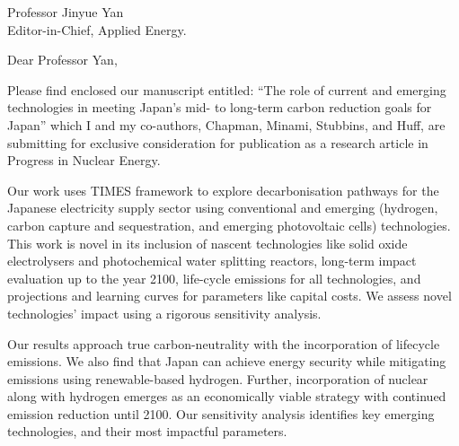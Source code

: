 \documentclass[10pt]{letter} %
\begin{document}


\begin{letter}{Professor Jinyue Yan\\
Editor-in-Chief, Applied Energy.}


\address{Anshuman Chaube\\
achaube2@illinois.edu\\
226 Talbot Laboratory\\
MC-234\\
104 S. Wright Street\\
Urbana, IL 61801}



\opening{Dear Professor Yan,}

Please find enclosed our manuscript entitled: ``The role of current and emerging technologies in meeting Japan's mid- to long-term carbon reduction goals for Japan'' which I and my co-authors, Chapman, Minami, Stubbins, and Huff, 
are submitting for exclusive consideration for publication as a research 
article in Progress in Nuclear Energy.

Our work uses TIMES framework to explore decarbonisation pathways for the Japanese electricity supply sector using conventional and emerging (hydrogen, carbon capture and sequestration, and emerging photovoltaic cells) technologies. This work is novel in its inclusion of nascent technologies like solid oxide electrolysers and photochemical water splitting reactors, long-term impact evaluation up to the year 2100, life-cycle emissions for all technologies, and projections and learning curves for parameters like capital costs. We assess novel technologies’ impact using a rigorous sensitivity analysis.

Our results approach true carbon-neutrality with the incorporation of lifecycle emissions. We also find that Japan can achieve energy security while mitigating emissions using renewable-based hydrogen. Further, incorporation of nuclear along with hydrogen emerges as an economically viable strategy with continued emission reduction until 2100. Our sensitivity analysis identifies key emerging technologies, and their most impactful parameters. 


\end{letter}
\end{document}
